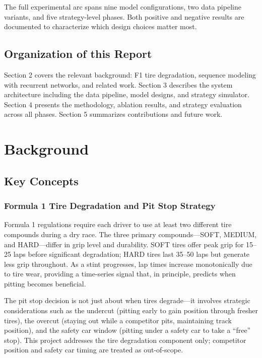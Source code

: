 \documentclass[12pt]{article}
\begin{document}
The full experimental arc spans nine model configurations, two data pipeline variants, and five strategy-level phases. Both positive and negative results are documented to characterize which design choices matter most.

\subsection{Organization of this Report}

Section 2 covers the relevant background: F1 tire degradation, sequence modeling with recurrent networks, and related work. Section 3 describes the system architecture including the data pipeline, model designs, and strategy simulator. Section 4 presents the methodology, ablation results, and strategy evaluation across all phases. Section 5 summarizes contributions and future work.

\section{Background}

\subsection{Key Concepts}

\subsubsection{Formula 1 Tire Degradation and Pit Stop Strategy}

Formula 1 regulations require each driver to use at least two different tire compounds during a dry race. The three primary compounds---SOFT, MEDIUM, and HARD---differ in grip level and durability. SOFT tires offer peak grip for 15--25 laps before significant degradation; HARD tires last 35--50 laps but generate less grip throughout. As a stint progresses, lap times increase monotonically due to tire wear, providing a time-series signal that, in principle, predicts when pitting becomes beneficial.

The pit stop decision is not just about when tires degrade---it involves strategic considerations such as the undercut (pitting early to gain position through fresher tires), the overcut (staying out while a competitor pits, maintaining track position), and the safety car window (pitting under a safety car to take a ``free'' stop). This project addresses the tire degradation component only; competitor position and safety car timing are treated as out-of-scope.
\end{document}
